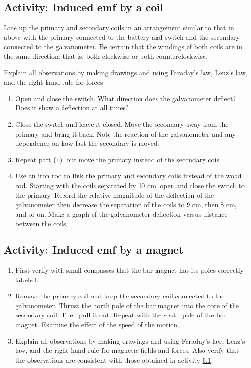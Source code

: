 \begin{multicols}{2}
\subsection{Activity: Induced emf by a coil} \label{s:coilind}
	Line up the primary and secondary coils in an arrangement similar to that in  above with the primary connected to the battery and switch and the secondary connected to the galvanometer.  Be certain that the windings of both coils are in the same direction: that is, both clockwise or both counterclockwise. 
	
	Explain all observations by making drawings and using Faraday's law, Lenz's law, and the \textsf{right hand rule for forces}
\begin{enumerate}[noitemsep]
	 \item Open and close the switch.  What direction does the galvanometer deflect?  Does it show a deflection at all times?  
	\item Close the switch and leave it closed.  Move the secondary away from the primary and bring it back.  Note the reaction of the galvanometer and any dependence on how fast the secondary is moved.
	\item Repeat part ($1$), but move the primary instead of the secondary cois.
	\item Use an iron rod to link the primary and secondary coils instead of the wood rod.  Starting with the coils separated by 10 cm, open and close the switch to the primary.  Record the relative magnitude of the deflection of the galvanometer then decrease the separation of the coils to 9 cm, then 8 cm, and so on.  Make a graph of the galvanometer deflection versus distance between the coils. 
\end{enumerate}

\subsection{Activity: Induced emf by a magnet}
\begin{enumerate}[noitemsep]
	 \item First verify with small compasses that the bar magnet has its poles correctly labeled.
	\item  Remove the primary coil and keep the secondary coil connected to the galvanometer.  Thrust the north pole of the bar magnet into the core of the secondary coil.  Then pull it out.  Repeat with the south pole of the bar magnet.  Examine the effect of the speed of the motion.  
	\item Explain all observations by making drawings and using Faraday's law, Lenz's law, and the \textsf{right hand rule for magnetic fields and forces}.  Also verify that the observations are consistent with those obtained in activity \ref{s:coilind}. 
\end{enumerate}


\end{multicols}
